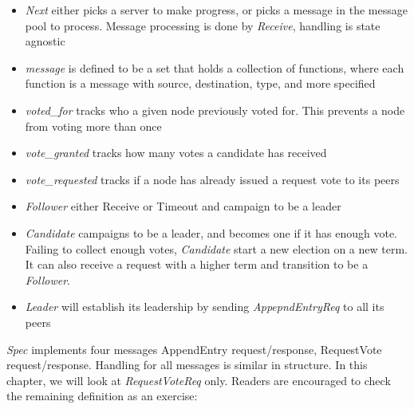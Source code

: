 \begin{tlatex}
\@pvspace{8.0pt}%
%
%
%
%
%
%
%
%
%
\@pvspace{8.0pt}%
%
%
%
%
%
%
\end{tlatex}

\begin{itemize}
    \item \textit{Next} either picks a server to make progress, or picks a
    message in the message pool to process. Message processing is done by
    \textit{Receive}, handling is state agnostic
    \item \textit{message} is defined to be a set that holds a collection of functions, where 
    each function is a message with source, destination, type, and more specified
    \item \textit{voted\_for} tracks who a given node previously voted for.
    This prevents a node from voting more than once
    \item \textit{vote\_granted} tracks how many votes a candidate has received
    \item \textit{vote\_requested} tracks if a node has already issued a request
    vote to its peers
    \item \textit{Follower} either Receive or Timeout and campaign to be a leader
    \item \textit{Candidate} campaigns to be a leader, and becomes one if it has
    enough vote. Failing to collect enough votes, \textit{Candidate} start a new
    election on a new term. It can also receive a request with a higher term and
    transition to be a \textit{Follower}.
    \item \textit{Leader} will establish its leadership by sending
    \textit{AppepndEntryReq} to all its peers
\end{itemize}

 \textit{Spec} implements four messages AppendEntry request/response, RequestVote
request/response. Handling for all messages is similar in structure. In
this chapter, we will look at \textit{RequestVoteReq} only. Readers are
encouraged to check the remaining definition as an exercise:\newline

